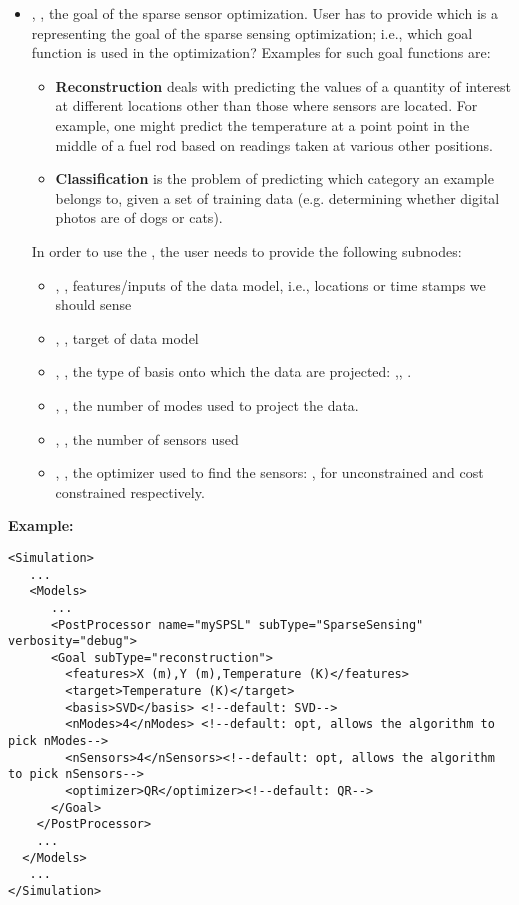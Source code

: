 \begin{itemize}
\item {}, , the goal of the sparse sensor optimization.
User has to provide  which is a  representing the goal of the sparse sensing optimization; i.e., which goal function is used in the optimization? Examples for such goal functions are:
\begin{itemize}
    \item \textbf{Reconstruction} deals with predicting the values of a quantity of interest at different locations other than those where sensors are located. For example, one might predict the temperature at a point point in the middle of a fuel rod based on readings taken at various other positions.

    \item \textbf{Classification} is the problem of predicting which category an example belongs to, given a set of training data (e.g. determining whether digital photos are of dogs or cats).
\end{itemize}
In order to use the , the user needs to provide the following subnodes:
\begin{itemize}
	\item {}, , features/inputs of the data model, i.e., locations or time stamps we should sense
	\item {}, , target of data model
	\item {} , , the type of basis onto which the data are projected: ,, . 
	\item {},  , the number of modes  used to project the data.
	\item {},  , the number of sensors used
	\item {},  , the optimizer used to find the sensors: ,  for unconstrained and cost constrained respectively.
\end{itemize}
\end{itemize}

\textbf{Example:}
\begin{lstlisting}[style=XML]
<Simulation>
   ...
   <Models>
      ...
      <PostProcessor name="mySPSL" subType="SparseSensing" verbosity="debug">
      <Goal subType="reconstruction">
        <features>X (m),Y (m),Temperature (K)</features>
        <target>Temperature (K)</target>
        <basis>SVD</basis> <!--default: SVD-->
        <nModes>4</nModes> <!--default: opt, allows the algorithm to pick nModes-->
        <nSensors>4</nSensors><!--default: opt, allows the algorithm to pick nSensors-->
        <optimizer>QR</optimizer><!--default: QR-->
      </Goal>
    </PostProcessor>
    ...
  </Models>
   ...
</Simulation>
\end{lstlisting}
